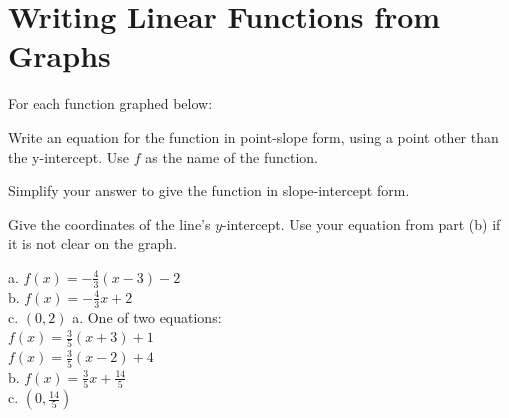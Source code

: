 \section*{Writing Linear Functions from Graphs}
For each function graphed below:
\begin{clist}
\item Write an equation for the function in point-slope form, using a point other than the y-intercept. Use $f$ as the name of the function.
\item Simplify your answer to give the function in slope-intercept form.
\item Give the coordinates of the line's $y$-intercept. Use your equation from part (b) if it is not clear on the graph.
\end{clist}
\begin{smenum}
\mitemxx
{
a. $f(x)=-\frac{4}{3}(x-3)-2$\\
b. $f(x)=-\frac{4}{3}x+2$\\
c. $(0,2)$
}{
a. One of two equations:\\$f(x)=\frac{3}{5}(x+3)+1$\\$f(x)=\frac{3}{5}(x-2)+4$\\
b. $f(x)=\frac{3}{5}x+\frac{14}{5}$\\
c. $(0,\frac{14}{5})$
}
\end{smenum}

\clearpage
